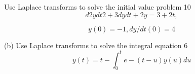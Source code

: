
Use Laplace transforms to solve the initial value problem 10
\[ d2ydt2  + 3dydt + 2y = 3 + 2t, \]

\[y(0) = −1,
dy/dt(0) = 4\]

\newpage

(b) Use Laplace transforms to solve the integral equation 6
\[ y(t) = t − \int^t_0
e
−(t−u)
y(u)du

\]


